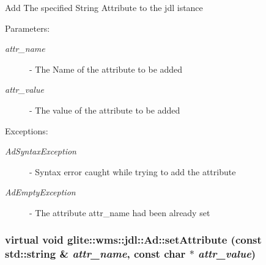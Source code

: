 Add The specified String Attribute to the jdl istance \begin{Desc}
\item[Parameters:]
\begin{description}
\item[{\em attr\_\-name}]- The Name of the attribute to be added \item[{\em attr\_\-value}]- The value of the attribute to be added \end{description}
\end{Desc}
\begin{Desc}
\item[Exceptions:]
\begin{description}
\item[{\em Ad\-Syntax\-Exception}]- Syntax error caught while trying to add the attribute \item[{\em Ad\-Empty\-Exception}]- The attribute attr\_\-name had been already set \end{description}
\end{Desc}
\hypertarget{classglite_1_1wms_1_1jdl_1_1Ad_z19_11}{
\subsubsection[setAttribute]{\setlength{\rightskip}{0pt plus 5cm}virtual void glite::wms::jdl::Ad::set\-Attribute (const std::string \& {\em attr\_\-name}, const char $\ast$ {\em attr\_\-value})}}
\label{classglite_1_1wms_1_1jdl_1_1Ad_z19_11}


